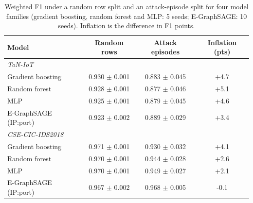 \begin{table}[t]
\centering
\small
\caption{Weighted F1 under a random row split and an attack-episode split for four model families (gradient boosting, random forest and MLP: 5 seeds; E-GraphSAGE: 10 seeds). Inflation is the difference in F1 points.}
\label{tab:split-models}
\begin{tabular}{lccc}
\toprule
Model & Random rows & Attack episodes & Inflation (pts) \\
\midrule
\multicolumn{4}{l}{\textit{ToN-IoT}} \\
\quad Gradient boosting & 0.930 $\pm$ 0.001 & 0.883 $\pm$ 0.045 & +4.7 \\
\quad Random forest & 0.928 $\pm$ 0.001 & 0.877 $\pm$ 0.046 & +5.1 \\
\quad MLP & 0.925 $\pm$ 0.001 & 0.879 $\pm$ 0.045 & +4.6 \\
\quad E-GraphSAGE (IP:port) & 0.923 $\pm$ 0.002 & 0.889 $\pm$ 0.029 & +3.4 \\
\multicolumn{4}{l}{\textit{CSE-CIC-IDS2018}} \\
\quad Gradient boosting & 0.971 $\pm$ 0.001 & 0.930 $\pm$ 0.032 & +4.1 \\
\quad Random forest & 0.970 $\pm$ 0.001 & 0.944 $\pm$ 0.028 & +2.6 \\
\quad MLP & 0.970 $\pm$ 0.001 & 0.949 $\pm$ 0.027 & +2.1 \\
\quad E-GraphSAGE (IP:port) & 0.967 $\pm$ 0.002 & 0.968 $\pm$ 0.005 & -0.1 \\
\bottomrule
\end{tabular}
\end{table}
